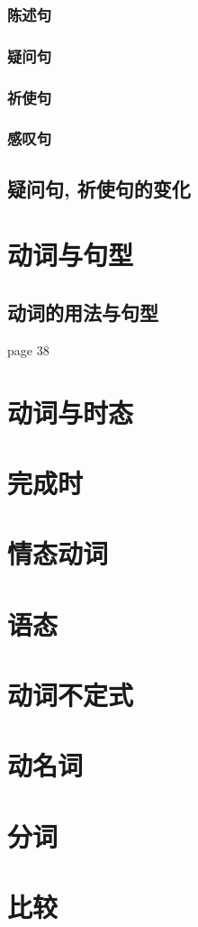 \documentclass{article}
\begin{document}
\subsubsection{陈述句}
\subsubsection{疑问句}
\subsubsection{祈使句}
\subsubsection{感叹句}
\subsection{疑问句, 祈使句的变化}
\section{动词与句型}
\subsection{动词的用法与句型}
page 38
\section{动词与时态}
\section{完成时}
\section{情态动词}
\section{语态}
\section{动词不定式}
\section{动名词}
\section{分词}
\section{比较}
\end{document}
